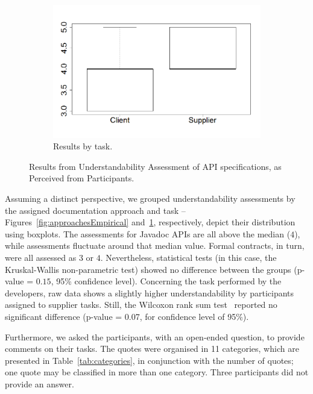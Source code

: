 \begin{figure}
\begin{subfigure}{.33\textwidth}
\includegraphics[width=1\linewidth]{figs/boxplotTasksEmpiricalStudy}
\caption{Results by task.}
\label{fig:tasksEmpirical}
\end{subfigure}
\caption{Results from Understandability Assessment of API specifications, as Perceived from Participants.}
\label{fig:empiricalResults}
\end{figure}

Assuming a distinct perspective, we grouped understandability assessments by the assigned documentation approach and task -- Figures~\ref{fig:approachesEmpirical} and~\ref{fig:tasksEmpirical}, respectively, depict their distribution using boxplots.
The assessments for Javadoc APIs are all above the median ($4$), while \contractjdoc{} assessments fluctuate around that median value. Formal contracts, in turn, were all assessed as $3$ or $4$.  
Nevertheless, statistical tests (in this case, the Kruskal-Wallis non-parametric test) showed no difference between the groups (p-value = $0.15$, 95\% confidence level).
Concerning the task performed by the developers, raw data shows a slightly higher understandability by participants assigned to supplier tasks. Still, the Wilcoxon rank sum test~\cite{statistical} reported no significant difference (p-value = 0.07, for confidence level of 95\%).

Furthermore, we asked the participants, with an open-ended question, to provide comments on their tasks.
The quotes were organised in 11 categories, which are presented in Table~\ref{tab:categories}, in conjunction with the number of quotes; one quote may be classified in more than one category. Three participants did not provide an answer.

